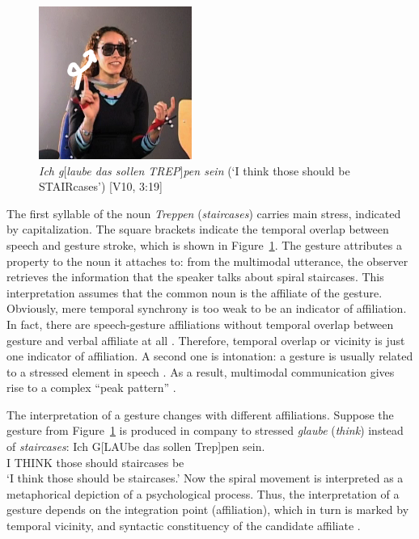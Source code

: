 \documentclass[output=paper
                ,modfonts
                ,nonflat
	        ,collection
	        ,collectionchapter
	        ,collectiontoclongg
 	        ,biblatex
                ,babelshorthands
                ,newtxmath
                ,draftmode
                ,colorlinks, citecolor=brown
]{./langsci/langscibook}
\begin{document}
\begin{figure}[tb]
  \includegraphics[trim={1cm 1cm 1cm 1cm}, clip, width=5cm]{figures/treppen-2}
  \caption[Staircases]{\textit{Ich g}[\textit{laube das sollen TREP}]\textit{pen sein} (\enquote*{I think those should be STAIRcases}) [V10, 3:19]}
  \label{fig:staircases}
\end{figure}

The first syllable of the  noun \textit{Treppen} (\textit{staircases}) carries main stress, indicated by capitalization. 
%
The square brackets indicate the temporal overlap between speech and gesture stroke, which is shown in Figure~\ref{fig:staircases}.
%
The gesture attributes a property to the noun it attaches to: from the multimodal utterance, the observer retrieves the information that the speaker talks about spiral staircases. 
%
This interpretation assumes that the common noun is the affiliate of the gesture.
%
Obviously, mere temporal synchrony is too weak to be an indicator of affiliation.
%
In fact, there are speech-gesture affiliations without temporal overlap between gesture and verbal affiliate at all \citep[e.g.][]{Luecking:Rieser:Stegmann:2004}.
%
Therefore, temporal overlap or vicinity is just one indicator of affiliation. A second one is intonation: a gesture is usually related to a stressed element in speech \citep{McClave:1994,Nobe:2000,Loehr:2004,Loehr:2007}. 
%
As a result, multimodal communication gives rise to a complex \enquote{peak pattern} \citep{Tuite:1993,Loehr:2004,Jannedy:Mendoza-Denton:2005}.


The interpretation of a gesture changes with different affiliations. 
%
Suppose the gesture from Figure~\ref{fig:staircases} is produced in company to stressed \textit{glaube} (\textit{think}) instead of \textit{staircases}: 
%
\ea \label{ex:think}
\gll Ich G[LAUbe das sollen Trep]pen sein.\\
     I THINK those should staircases be \\
\glt \enquote*{I think those should be staircases.}
\z
%
Now the spiral movement is interpreted as a metaphorical depiction of a psychological process.
%
Thus, the interpretation of a gesture depends on the integration point (affiliation),  which in turn is marked by temporal vicinity,  and syntactic constituency of the candidate affiliate \citep{Alahverdzhieva:Lascarides:Flickinger:2017}.
\end{document}
